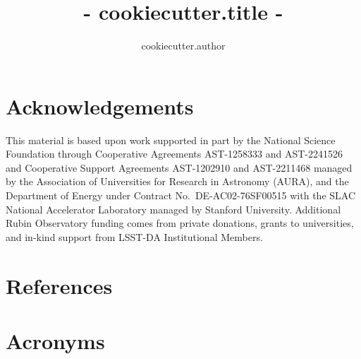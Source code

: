 \documentclass[{{ cookiecutter.lsstdoc_org }},toc]{lsstdoc}
\title{ {{- cookiecutter.title -}} }
\author{%
{{ cookiecutter.author }}
}
\date{\vcsDate}
\begin{document}
\maketitle


\appendix

\section{Acknowledgements}

This material is based upon work supported in part by the National Science Foundation through Cooperative Agreements AST-1258333 and AST-2241526 and Cooperative Support Agreements AST-1202910 and AST-2211468 managed by the Association of Universities for Research in Astronomy (AURA), and the Department of Energy under Contract No.\ DE-AC02-76SF00515 with the SLAC National Accelerator Laboratory managed by Stanford University.
Additional Rubin Observatory funding comes from private donations, grants to universities, and in-kind support from LSST-DA Institutional Members.

\section{References} \label{sec:bib}
\renewcommand{\refname}{} %


\section{Acronyms} \label{sec:acronyms}

\end{document}
